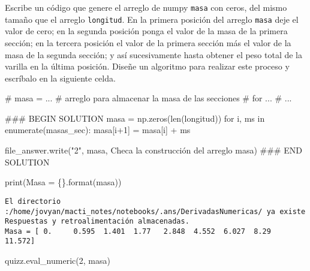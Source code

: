 \documentclass[
  letterpaper,
  DIV=11,
  numbers=noendperiod]{scrreprt}
\newenvironment{Shaded}{\begin{snugshade}}{\end{snugshade}}
\newcommand{\BuiltInTok}[1]{\textcolor[rgb]{0.00,0.23,0.31}{#1}}
\newcommand{\CommentTok}[1]{\textcolor[rgb]{0.37,0.37,0.37}{#1}}
\newcommand{\ControlFlowTok}[1]{\textcolor[rgb]{0.00,0.23,0.31}{#1}}
\newcommand{\DecValTok}[1]{\textcolor[rgb]{0.68,0.00,0.00}{#1}}
\newcommand{\KeywordTok}[1]{\textcolor[rgb]{0.00,0.23,0.31}{#1}}
\newcommand{\NormalTok}[1]{\textcolor[rgb]{0.00,0.23,0.31}{#1}}
\newcommand{\OperatorTok}[1]{\textcolor[rgb]{0.37,0.37,0.37}{#1}}
\newcommand{\RegionMarkerTok}[1]{\textcolor[rgb]{0.00,0.23,0.31}{#1}}
\newcommand{\SpecialCharTok}[1]{\textcolor[rgb]{0.37,0.37,0.37}{#1}}
\newcommand{\StringTok}[1]{\textcolor[rgb]{0.13,0.47,0.30}{#1}}
\begin{document}
Escribe un código que genere el arreglo de numpy \texttt{masa} con
ceros, del mismo tamaño que el arreglo \texttt{longitud}. En la primera
posición del arreglo \texttt{masa} deje el valor de cero; en la segunda
posición ponga el valor de la masa de la primera sección; en la tercera
posición el valor de la primera sección más el valor de la masa de la
segunda sección; y así sucesivamente hasta obtener el peso total de la
varilla en la última posición. Diseñe un algoritmo para realizar este
proceso y escríbalo en la siguiente celda.

\begin{Shaded}
\begin{Highlighting}[]
\CommentTok{\# masa = ... \# arreglo para almacenar la masa de las secciones}
\CommentTok{\# for ...}
\CommentTok{\#     ...}

\CommentTok{\#\#\# }\RegionMarkerTok{BEGIN}\CommentTok{ SOLUTION}
\NormalTok{masa }\OperatorTok{=}\NormalTok{ np.zeros(}\BuiltInTok{len}\NormalTok{(longitud))}
\ControlFlowTok{for}\NormalTok{ i, ms }\KeywordTok{in} \BuiltInTok{enumerate}\NormalTok{(masas\_sec):}
\NormalTok{    masa[i}\OperatorTok{+}\DecValTok{1}\NormalTok{] }\OperatorTok{=}\NormalTok{ masa[i] }\OperatorTok{+}\NormalTok{ ms}
    
\NormalTok{file\_answer.write(}\StringTok{"2"}\NormalTok{, masa, }\StringTok{\textquotesingle{}Checa la construcción del arreglo masa\textquotesingle{}}\NormalTok{)}
\CommentTok{\#\#\# }\RegionMarkerTok{END}\CommentTok{ SOLUTION}

\BuiltInTok{print}\NormalTok{(}\StringTok{\textquotesingle{}Masa = }\SpecialCharTok{\{\}}\StringTok{\textquotesingle{}}\NormalTok{.}\BuiltInTok{format}\NormalTok{(masa))}
\end{Highlighting}
\end{Shaded}

\begin{verbatim}
El directorio :/home/jovyan/macti_notes/notebooks/.ans/DerivadasNumericas/ ya existe
Respuestas y retroalimentación almacenadas.
Masa = [ 0.     0.595  1.401  1.77   2.848  4.552  6.027  8.29  11.572]
\end{verbatim}

\begin{Shaded}
\begin{Highlighting}[]
\NormalTok{quizz.eval\_numeric(}\StringTok{\textquotesingle{}2\textquotesingle{}}\NormalTok{, masa)}
\end{Highlighting}
\end{Shaded}
\end{document}
